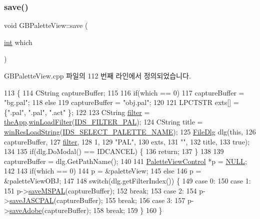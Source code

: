 \subsubsection{\texorpdfstring{save()}{save()}}
{\footnotesize\ttfamily void G\+B\+Palette\+View\+::save (\begin{DoxyParamCaption}\item[{\mbox{\hyperlink{_util_8cpp_a0ef32aa8672df19503a49fab2d0c8071}{int}}}]{which }\end{DoxyParamCaption})}



G\+B\+Palette\+View.\+cpp 파일의 112 번째 라인에서 정의되었습니다.


\begin{DoxyCode}
113 \{
114   CString captureBuffer;
115 
116   \textcolor{keywordflow}{if}(which == 0)
117     captureBuffer = \textcolor{stringliteral}{"bg.pal"};
118   \textcolor{keywordflow}{else}
119     captureBuffer = \textcolor{stringliteral}{"obj.pal"};
120 
121   LPCTSTR exts[] = \{\textcolor{stringliteral}{".pal"}, \textcolor{stringliteral}{".pal"}, \textcolor{stringliteral}{".act"} \};
122   
123   CString \mbox{\hyperlink{_s_d_l_8cpp_af0122ee4312107103b580a98c74a4ea6}{filter}} = \mbox{\hyperlink{_v_b_a_8cpp_a8095a9d06b37a7efe3723f3218ad8fb3}{theApp}}.\mbox{\hyperlink{class_v_b_a_a228edf26b0dc4129658c174ee5a3c27c}{winLoadFilter}}(\mbox{\hyperlink{resource_8h_a65a0ab73214f4021e52db11beee73f70}{IDS\_FILTER\_PAL}});
124   CString title = \mbox{\hyperlink{_win_res_util_8cpp_a416e85e80ab9b01376e87251c83d1a5a}{winResLoadString}}(\mbox{\hyperlink{resource_8h_ae1ae47cd897a7fa4d25f3ce304604cc2}{IDS\_SELECT\_PALETTE\_NAME}});
125   \mbox{\hyperlink{class_file_dlg}{FileDlg}} dlg(\textcolor{keyword}{this},
126               captureBuffer,
127               \mbox{\hyperlink{_s_d_l_8cpp_af0122ee4312107103b580a98c74a4ea6}{filter}},
128               1,
129               \textcolor{stringliteral}{"PAL"},
130               exts,
131               \textcolor{stringliteral}{""},
132               title,
133               \textcolor{keyword}{true});
134 
135   \textcolor{keywordflow}{if}(dlg.DoModal() == IDCANCEL) \{
136     \textcolor{keywordflow}{return};
137   \}
138 
139   captureBuffer = dlg.GetPathName();
140 
141   \mbox{\hyperlink{class_palette_view_control}{PaletteViewControl}} *p = \mbox{\hyperlink{getopt1_8c_a070d2ce7b6bb7e5c05602aa8c308d0c4}{NULL}};
142 
143   \textcolor{keywordflow}{if}(which == 0)
144     p = &paletteView;
145   \textcolor{keywordflow}{else}
146     p = &paletteViewOBJ;
147   
148   \textcolor{keywordflow}{switch}(dlg.getFilterIndex()) \{
149   \textcolor{keywordflow}{case} 0:
150   \textcolor{keywordflow}{case} 1:
151     p->\mbox{\hyperlink{class_palette_view_control_a0e2249bb157bf7fb36b128a83bf108b5}{saveMSPAL}}(captureBuffer);
152     \textcolor{keywordflow}{break};
153   \textcolor{keywordflow}{case} 2:
154     p->\mbox{\hyperlink{class_palette_view_control_a9efcff77eaf476013ac5f3ebd2d53779}{saveJASCPAL}}(captureBuffer);
155     \textcolor{keywordflow}{break};
156   \textcolor{keywordflow}{case} 3:
157     p->\mbox{\hyperlink{class_palette_view_control_a14d553a87d89463719adcaa63f42a72b}{saveAdobe}}(captureBuffer);
158     \textcolor{keywordflow}{break};
159   \}
160 \}
\end{DoxyCode}
